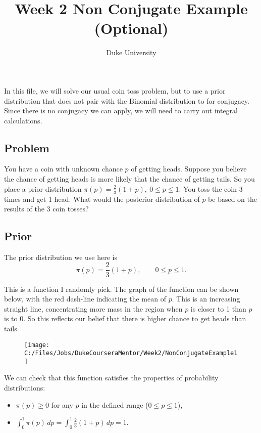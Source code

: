 \documentclass{article}
\def\dsst{\displaystyle}
\begin{document}
\title{Week 2 Non Conjugate Example (Optional)}
\author{Duke University}
\date{}
\maketitle 




In this file, we will solve our usual coin toss problem, but to use a prior distribution that does not pair with the Binomial distribution to for conjugacy. Since there is no conjugacy we can apply, we will need to carry out integral calculations.

\subsection*{Problem}
\begin{displayquote}
	You have a coin with unknown chance $p$ of getting heads. Suppose you believe the chance of getting heads is more likely that the chance of getting tails. So you place a prior distribution $\dsst \pi(p) = \frac{2}{3}(1+p),\ 0\leq p \leq 1$. You toss the coin 3 times and get 1 head. What would the posterior distribution of $p$ be based on the results of the 3 coin tosses? 
\end{displayquote}

\subsection*{Prior}

The prior distribution we use here is
$$ \pi(p) = \frac{2}{3}(1+p),\qquad 0\leq p \leq 1. $$

This is a function I randomly pick. The graph of the function can be shown below, with the red dash-line indicating the mean of $p$. This is an increasing straight line, concentrating more mass in the region when $p$ is closer to 1 than $p$ is to 0. So this reflects our belief that there is higher chance to get heads than tails.
\begin{figure}[tbph]
	\centering
	\texttt{[image: C:/Files/Jobs/DukeCourseraMentor/Week2/NonConjugateExample1]}
\end{figure}


We can check that this function satisfies the properties of probability distributions:
\begin{itemize}
	\item $\pi(p)\geq 0$ for any $p$ in the defined range ($0\leq p \leq 1$),
	
	\item $\dsst \int_0^1 \pi(p)\, dp = \int_0^1 \frac{2}{3}(1+p)\, dp = 1$.
\end{itemize}
\end{document}
